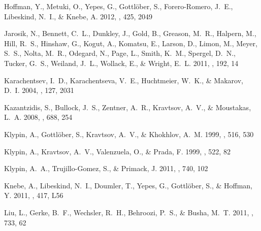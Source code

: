 \documentclass{emulateapj}
\begin{document}
\begin{thebibliography}{30}
{Hoffman}, Y., {Metuki}, O., {Yepes}, G., {Gottl{\"o}ber}, S., {Forero-Romero},
  J.~E., {Libeskind}, N.~I., \& {Knebe}, A. 2012, \mnras, 425, 2049

{Jarosik}, N., {Bennett}, C.~L., {Dunkley}, J., {Gold}, B., {Greason}, M.~R.,
  {Halpern}, M., {Hill}, R.~S., {Hinshaw}, G., {Kogut}, A., {Komatsu}, E.,
  {Larson}, D., {Limon}, M., {Meyer}, S.~S., {Nolta}, M.~R., {Odegard}, N.,
  {Page}, L., {Smith}, K.~M., {Spergel}, D.~N., {Tucker}, G.~S., {Weiland},
  J.~L., {Wollack}, E., \& {Wright}, E.~L. 2011, \apjs, 192, 14

{Karachentsev}, I.~D., {Karachentseva}, V.~E., {Huchtmeier}, W.~K., \&
  {Makarov}, D.~I. 2004, \aj, 127, 2031

{Kazantzidis}, S., {Bullock}, J.~S., {Zentner}, A.~R., {Kravtsov}, A.~V., \&
  {Moustakas}, L.~A. 2008, \apj, 688, 254

{Klypin}, A., {Gottl{\"o}ber}, S., {Kravtsov}, A.~V., \& {Khokhlov}, A.~M.
  1999{}, \apj, 516, 530

{Klypin}, A., {Kravtsov}, A.~V., {Valenzuela}, O., \& {Prada}, F.
  1999{}, \apj, 522, 82

{Klypin}, A.~A., {Trujillo-Gomez}, S., \& {Primack}, J. 2011, \apj, 740, 102

{Knebe}, A., {Libeskind}, N.~I., {Doumler}, T., {Yepes}, G., {Gottl{\"o}ber},
  S., \& {Hoffman}, Y. 2011, \mnras, 417, L56

{Liu}, L., {Gerke}, B.~F., {Wechsler}, R.~H., {Behroozi}, P.~S., \& {Busha},
  M.~T. 2011, \apj, 733, 62


\end{thebibliography}
\end{document}

